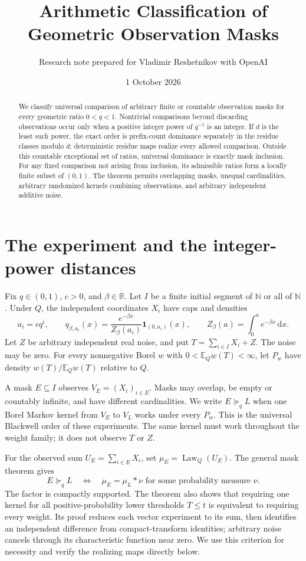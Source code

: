 \documentclass[11pt,a4paper]{article}
\title{Arithmetic Classification of Geometric Observation Masks}
\author{Research note prepared for Vladimir Reshetnikov with OpenAI}
\date{1 October 2026}
\theoremstyle{remark}\newtheorem*{ednote}{Editorial note (ProveIt, 2026-10-01)}
\newcommand{\E}{\mathbb E}\newcommand{\R}{\mathbb R}\newcommand{\C}{\mathbb C}\newcommand{\N}{\mathbb N}
\newcommand{\Law}{\operatorname{Law}}\newcommand{\ind}{\mathbf1}
\newcommand{\dd}{\,\mathrm d}\newcommand{\ii}{\mathrm i}
\begin{document}
\maketitle
\begin{abstract}
We classify universal comparison of arbitrary finite or countable observation masks for every geometric ratio $0<q<1$. Nontrivial comparisons beyond discarding observations occur only when a positive integer power of $q^{-1}$ is an integer. If $d$ is the least such power, the exact order is prefix-count dominance separately in the residue classes modulo $d$; deterministic residue maps realize every allowed comparison. Outside this countable exceptional set of ratios, universal dominance is exactly mask inclusion. For any fixed comparison not arising from inclusion, its admissible ratios form a locally finite subset of $(0,1)$. The theorem permits overlapping masks, unequal cardinalities, arbitrary randomized kernels combining observations, and arbitrary independent additive noise.
\end{abstract}

\section{The experiment and the integer-power distances}
Fix $q\in(0,1)$, $c>0$, and $\beta\in\R$. Let $I$ be a finite initial segment of $\N$ or all of $\N$. Under $Q$, the independent coordinates $X_i$ have caps and densities
\[
 a_i=cq^i,
 \qquad q_{\beta,a_i}(x)=\frac{e^{-\beta x}}{Z_\beta(a_i)}\ind_{(0,a_i)}(x),
 \qquad Z_\beta(a)=\int_0^ae^{-\beta x}\dd x.
\]
Let $Z$ be arbitrary independent real noise, and put $T=\sum_{i\in I}X_i+Z$. The noise may be zero. For every nonnegative Borel $w$ with $0<\E_Qw(T)<\infty$, let $P_w$ have density $w(T)/\E_Qw(T)$ relative to $Q$.

A mask $E\subseteq I$ observes $V_E=(X_i)_{i\in E}$. Masks may overlap, be empty or countably infinite, and have different cardinalities. We write $E\succeq_q L$ when one Borel Markov kernel from $V_E$ to $V_L$ works under every $P_w$. This is the universal Blackwell order of these experiments. The same kernel must work throughout the weight family; it does not observe $T$ or $Z$.

For the observed sum $U_E=\sum_{i\in E}X_i$, set $\mu_E=\Law_Q(U_E)$. The general mask theorem \cite{Masks} gives
\begin{equation}\label{eq:conv}
 E\succeq_q L\quad\Longleftrightarrow\quad
 \mu_E=\mu_L*\nu\text{ for some probability measure }\nu.
\end{equation}
The factor is compactly supported. The theorem also shows that requiring one kernel for all positive-probability lower thresholds $T\le t$ is equivalent to requiring every weight. Its proof reduces each vector experiment to its sum, then identifies an independent difference from compact-transform identities; arbitrary noise cancels through its characteristic function near zero. We use this criterion for necessity and verify the realizing maps directly below.
\end{document}
